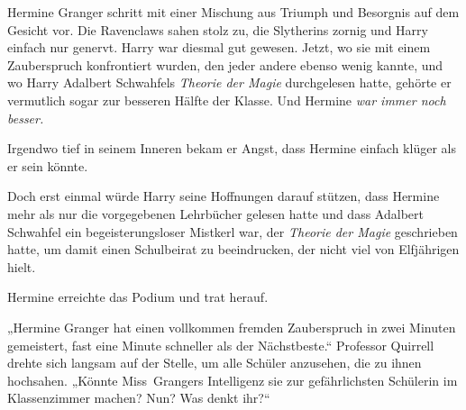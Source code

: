Hermine Granger schritt mit einer Mischung aus Triumph und Besorgnis auf dem Gesicht vor. Die Ravenclaws sahen stolz zu, die Slytherins zornig und Harry einfach nur genervt. Harry war diesmal gut gewesen. Jetzt, wo sie mit einem Zauberspruch konfrontiert wurden, den jeder andere ebenso wenig kannte, und wo Harry Adalbert Schwahfels \emph{Theorie der Magie} durchgelesen hatte, gehörte er vermutlich sogar zur besseren Hälfte der Klasse. Und Hermine \emph{war immer noch besser.}

Irgendwo tief in seinem Inneren bekam er Angst, dass Hermine einfach klüger als er sein könnte.

Doch erst einmal würde Harry seine Hoffnungen darauf stützen, dass Hermine mehr als nur die vorgegebenen Lehrbücher gelesen hatte und dass Adalbert Schwahfel ein begeisterungsloser Mistkerl war, der \emph{Theorie der Magie} geschrieben hatte, um damit einen Schulbeirat zu beeindrucken, der nicht viel von Elfjährigen hielt.

Hermine erreichte das Podium und trat herauf.

„Hermine Granger hat einen vollkommen fremden Zauberspruch in zwei Minuten gemeistert, fast eine Minute schneller als der Nächstbeste.“ Professor Quirrell drehte sich langsam auf der Stelle, um alle Schüler anzusehen, die zu ihnen hochsahen. „Könnte Miss~Grangers Intelligenz sie zur gefährlichsten Schülerin im Klassenzimmer machen? Nun? Was denkt ihr?“

